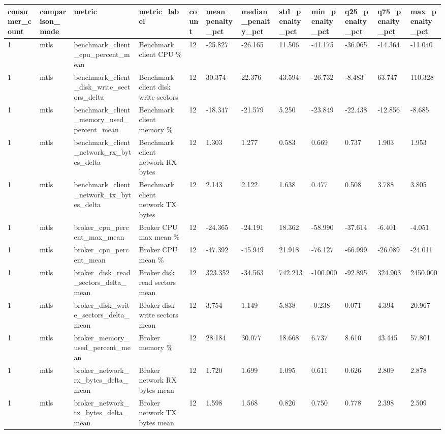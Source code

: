 \begin{longtable}{llllllllllll}
\hline
consumer\_count & comparison\_mode & metric & metric\_label & count & mean\_penalty\_pct & median\_penalty\_pct & std\_penalty\_pct & min\_penalty\_pct & q25\_penalty\_pct & q75\_penalty\_pct & max\_penalty\_pct \\
\hline
1 & mtls & benchmark\_client\_cpu\_percent\_mean & Benchmark client CPU \% & 12 & -25.827 & -26.165 & 11.506 & -41.175 & -36.065 & -14.364 & -11.040 \\
1 & mtls & benchmark\_client\_disk\_write\_sectors\_delta & Benchmark client disk write sectors & 12 & 30.374 & 22.376 & 43.594 & -26.732 & -8.483 & 63.747 & 110.328 \\
1 & mtls & benchmark\_client\_memory\_used\_percent\_mean & Benchmark client memory \% & 12 & -18.347 & -21.579 & 5.250 & -23.849 & -22.438 & -12.856 & -8.685 \\
1 & mtls & benchmark\_client\_network\_rx\_bytes\_delta & Benchmark client network RX bytes & 12 & 1.303 & 1.277 & 0.583 & 0.669 & 0.737 & 1.903 & 1.953 \\
1 & mtls & benchmark\_client\_network\_tx\_bytes\_delta & Benchmark client network TX bytes & 12 & 2.143 & 2.122 & 1.638 & 0.477 & 0.508 & 3.788 & 3.805 \\
1 & mtls & broker\_cpu\_percent\_max\_mean & Broker CPU max mean \% & 12 & -24.365 & -24.191 & 18.362 & -58.990 & -37.614 & -6.401 & -4.051 \\
1 & mtls & broker\_cpu\_percent\_mean & Broker CPU mean \% & 12 & -47.392 & -45.949 & 21.918 & -76.127 & -66.999 & -26.089 & -24.011 \\
1 & mtls & broker\_disk\_read\_sectors\_delta\_mean & Broker disk read sectors mean & 12 & 323.352 & -34.563 & 742.213 & -100.000 & -92.895 & 324.903 & 2450.000 \\
1 & mtls & broker\_disk\_write\_sectors\_delta\_mean & Broker disk write sectors mean & 12 & 3.754 & 1.149 & 5.838 & -0.238 & 0.071 & 4.394 & 20.967 \\
1 & mtls & broker\_memory\_used\_percent\_mean & Broker memory \% & 12 & 28.184 & 30.077 & 18.668 & 6.737 & 8.610 & 43.445 & 57.801 \\
1 & mtls & broker\_network\_rx\_bytes\_delta\_mean & Broker network RX bytes mean & 12 & 1.720 & 1.699 & 1.095 & 0.611 & 0.626 & 2.809 & 2.878 \\
1 & mtls & broker\_network\_tx\_bytes\_delta\_mean & Broker network TX bytes mean & 12 & 1.598 & 1.568 & 0.826 & 0.750 & 0.778 & 2.398 & 2.509 \\

\end{longtable}
